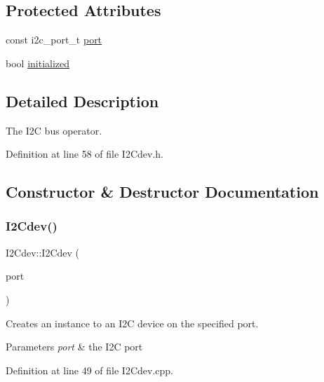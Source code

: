 \subsection*{Protected Attributes}
\begin{DoxyCompactItemize}
\item 
const i2c\+\_\+port\+\_\+t \mbox{\hyperlink{classI2Cdev_a1d1e63732aa9f50369172b27a034129c}{port}}
\item 
bool \mbox{\hyperlink{classI2Cdev_a94b914bfcbd0fe1f6fdd7b9c6f4ab921}{initialized}}
\end{DoxyCompactItemize}


\subsection{Detailed Description}
The I2C bus operator. 

Definition at line 58 of file I2\+Cdev.\+h.



\subsection{Constructor \& Destructor Documentation}
\mbox{\label{classI2Cdev_afd73def195a0441baf3e4dd774de606f}} 
\subsubsection{\texorpdfstring{I2Cdev()}{I2Cdev()}}
{\footnotesize\ttfamily I2\+Cdev\+::\+I2\+Cdev (\begin{DoxyParamCaption}\item[{const i2c\+\_\+port\+\_\+t}]{port }\end{DoxyParamCaption})\hspace{0.3cm}{\ttfamily [explicit]}}

Creates an instance to an I2C device on the specified port.


\begin{DoxyParams}{Parameters}
{\em port} & the I2C port \\
\hline
\end{DoxyParams}


Definition at line 49 of file I2\+Cdev.\+cpp.


